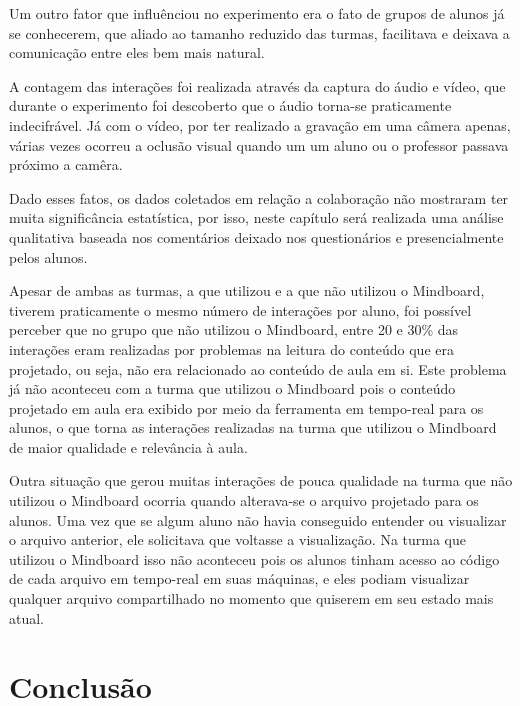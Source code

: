 Um outro fator que influênciou no experimento era o fato de grupos de alunos já se conhecerem, que aliado ao tamanho reduzido das turmas, facilitava e deixava a comunicação entre eles bem mais natural.

A contagem das interações foi realizada através da captura do áudio e vídeo, que durante o experimento foi descoberto que o áudio torna-se praticamente indecifrável. Já com o vídeo, por ter realizado a gravação em uma câmera apenas, várias vezes ocorreu a oclusão visual quando um um aluno ou o professor passava próximo a camêra.

Dado esses fatos, os dados coletados em relação a colaboração não mostraram ter muita significância estatística, por isso, neste capítulo será realizada uma análise qualitativa baseada nos comentários deixado nos questionários e presencialmente pelos alunos.

Apesar de ambas as turmas, a que utilizou e a que não utilizou o Mindboard, tiverem praticamente o mesmo número de interações por aluno, foi possível perceber que no grupo que não utilizou o Mindboard, entre 20 e 30\% das interações eram realizadas por problemas na leitura do conteúdo que era projetado, ou seja, não era relacionado ao conteúdo de aula em si. Este problema já não aconteceu com a turma que utilizou o Mindboard pois o conteúdo projetado em aula era exibido por meio da ferramenta em tempo-real para os alunos, o que torna as interações realizadas na turma que utilizou o Mindboard de maior qualidade e relevância à aula.

Outra situação que gerou muitas interações de pouca qualidade na turma que não utilizou o Mindboard ocorria quando alterava-se o arquivo projetado para os alunos. Uma vez que se algum aluno não havia conseguido entender ou visualizar o arquivo anterior, ele solicitava que voltasse a visualização. Na turma que utilizou o Mindboard isso não aconteceu pois os alunos tinham acesso ao código de cada arquivo em tempo-real em suas máquinas, e eles podiam visualizar qualquer arquivo compartilhado no momento que quiserem em seu estado mais atual.





\chapter{Conclusão}
\label{cap:conclusao}




